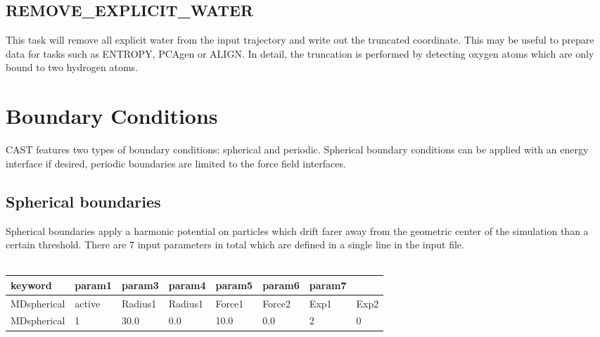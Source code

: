 \documentclass[10pt,a4paper]{article} %
\begin{document}
	\subsection{REMOVE\_EXPLICIT\_WATER}	
	This task will remove all explicit water from the input trajectory and write out the truncated coordinate. This may be useful to prepare data for tasks such as ENTROPY, PCAgen or ALIGN. In detail, the truncation is performed by detecting oxygen atoms which are only bound to two hydrogen atoms.\\
		

	\section{Boundary Conditions}
	\label{sec:boundary}
	\ac{CAST} features two types of boundary conditions: spherical and periodic. Spherical boundary conditions can be applied with an energy interface if desired, periodic boundaries are limited to the force field interfaces.

	\subsection{Spherical boundaries}
	Spherical boundaries apply a harmonic potential on particles which drift farer away from the geometric center of the simulation than a certain threshold. There are 7 input parameters in total which are defined in a single line in the input file. \\~\\

	\begin{tabularx}{\textwidth}{l|X|X|X|X|X|X|X}
		keyword & param1 & param3 & param4 & param5 & param6 & param7 \\
		\hline
		MDspherical & active & Radius1 & Radius1 & Force1 & Force2 & Exp1 & Exp2 \\
		MDspherical & 1 & 30.0 & 0.0 & 10.0 & 0.0 & 2 & 0 \\
	\end{tabularx}~\\
\end{document}
